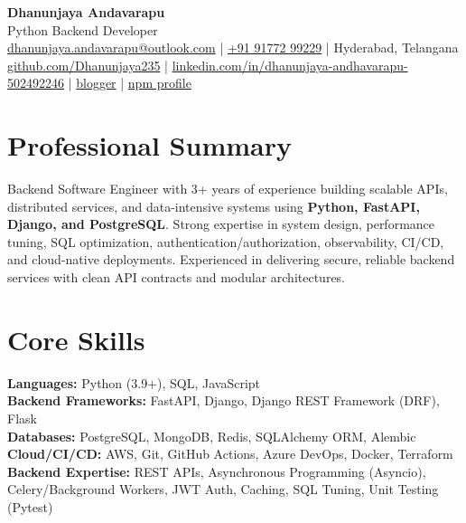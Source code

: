 \documentclass[11pt]{article}
\begin{document}
\begin{center}
    {\LARGE \textbf{Dhanunjaya Andavarapu}}\\
    \vspace{4pt}
    Python Backend Developer\\
    \vspace{4pt}
    \href{mailto:dhanunjaya.andavarapu@outlook.com}{dhanunjaya.andavarapu@outlook.com} \quad | \quad
    \href{tel:+919177299229}{+91 91772 99229} \quad | \quad
    Hyderabad, Telangana\\
    \vspace{4pt}
    \href{https://github.com/Dhanunjaya235}{github.com/Dhanunjaya235} \quad | \quad
    \href{https://www.linkedin.com/in/dhanunjaya-andhavarapu-502492246}{linkedin.com/in/dhanunjaya-andhavarapu-502492246} \quad | \quad
    \href{https://www.blogger.com/blog/pages/2357939272283650645}{blogger} \quad | \quad
    \href{https://www.npmjs.com/settings/dhanunjay/packages}{npm profile}
\end{center}

\section*{Professional Summary}
Backend Software Engineer with 3+ years of experience building scalable APIs, distributed services, and data-intensive systems using \textbf{Python, FastAPI, Django, and PostgreSQL}. Strong expertise in system design, performance tuning, SQL optimization, authentication/authorization, observability, CI/CD, and cloud-native deployments. Experienced in delivering secure, reliable backend services with clean API contracts and modular architectures.

\section*{Core Skills}
\textbf{Languages:} Python (3.9+), SQL, JavaScript \\
\textbf{Backend Frameworks:} FastAPI, Django, Django REST Framework (DRF), Flask \\
\textbf{Databases:} PostgreSQL, MongoDB, Redis, SQLAlchemy ORM, Alembic \\
\textbf{Cloud/CI/CD:} AWS, Git, GitHub Actions, Azure DevOps, Docker, Terraform \\
\textbf{Backend Expertise:} REST APIs, Asynchronous Programming (Asyncio), Celery/Background Workers, JWT Auth, Caching, SQL Tuning, Unit Testing (Pytest)
\end{document}
